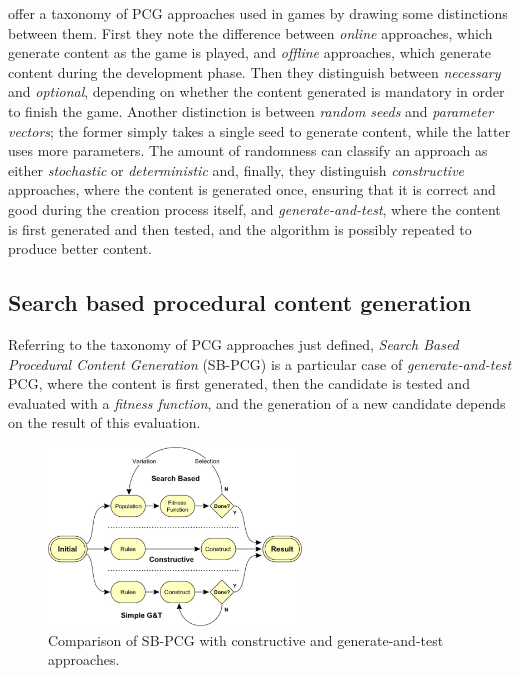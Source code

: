 \documentclass{Configuration_Files/PoliMi3i_thesis}
\begin{document}
 offer a taxonomy of PCG approaches used in games by drawing some distinctions between them. First they note the difference between \textit{online} approaches, which generate content as the game is played, and \textit{offline} approaches, which generate content during the development phase. Then they distinguish between \textit{necessary} and \textit{optional}, depending on whether the content generated is mandatory in order to finish the game. Another distinction is between \textit{random seeds} and \textit{parameter vectors}; the former simply takes a single seed to generate content, while the latter uses more parameters. The amount of randomness can classify an approach as either \textit{stochastic} or \textit{deterministic} and, finally, they distinguish \textit{constructive} approaches, where the content is generated once, ensuring that it is correct and good during the creation process itself, and \textit{generate-and-test}, where the content is first generated and then tested, and the algorithm is possibly repeated to produce better content. \cite{togelius_search-based_2010}

\subsection{Search based procedural content generation}
\label{subsec:search_based_pcg}
Referring to the taxonomy of PCG approaches just defined, \textit{Search Based Procedural Content Generation} (SB-PCG) is a particular case of \textit{generate-and-test} PCG, where the content is first generated, then the candidate is tested and evaluated with a \textit{fitness function}, and the generation of a new candidate depends on the result of this evaluation. \cite{togelius_search-based_2010}

\begin{figure}[hbt!]
    \centering
    \includegraphics[width=0.6\textwidth]{Images/Togelius.png}
    \caption{Comparison of SB-PCG with constructive and generate-and-test approaches.}
    \label{fig:pcg}
\end{figure}
\end{document}
